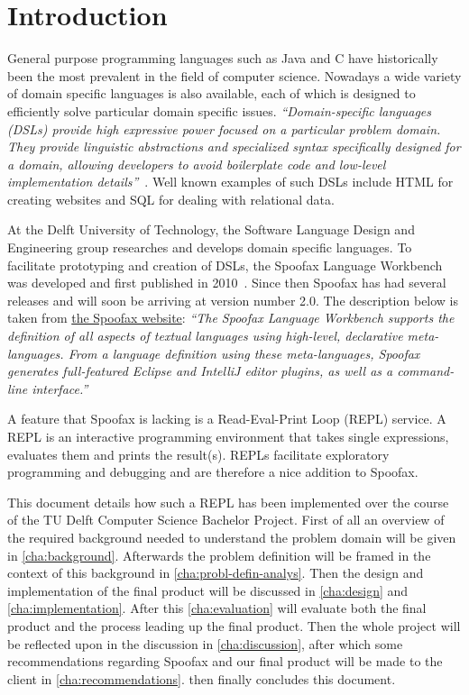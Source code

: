 \chapter{Introduction}
\label{cha:introduction}

General purpose programming languages such as Java and C have historically been
the most prevalent in the field of computer science. Nowadays a wide variety of
domain specific languages is also available, each of which is designed to
efficiently solve particular domain specific issues. \textit{``Domain-specific
languages (DSLs) provide high expressive power focused on a particular problem
domain. They provide linguistic abstractions and specialized syntax
specifically designed for a domain, allowing developers to avoid boilerplate
code and low-level implementation details''}~\cite{Kats10a}. Well known
examples of such DSLs include HTML for creating websites and SQL for dealing
with relational data.

At the Delft University of Technology, the Software Language Design and
Engineering group researches and develops domain specific languages. To
facilitate prototyping and creation of DSLs, the Spoofax Language Workbench was
developed and first published in 2010~\cite{Kats10a}. Since then Spoofax has had
several releases and will soon be arriving at version number 2.0. The
description below is taken from \href{http://spoofax.org}{the Spoofax website}:
\textit{``The Spoofax Language Workbench supports the definition of all aspects
of textual languages using high-level, declarative meta-languages. From a
language definition using these meta-languages, Spoofax generates full-featured
Eclipse and IntelliJ editor plugins, as well as a command-line interface.''}

A feature that Spoofax is lacking is a Read-Eval-Print Loop (REPL) service. A
REPL is an interactive programming environment that takes single expressions,
evaluates them and prints the result(s). REPLs facilitate exploratory
programming and debugging and are therefore a nice addition to Spoofax.

This document details how such a REPL has been implemented over the course of
the TU Delft Computer Science Bachelor Project. First of all an overview of the
required background needed to understand the problem domain will be given in
\cref{cha:background}. Afterwards the problem definition will be framed in the
context of this background in \cref{cha:probl-defin-analys}. Then the design
and implementation of the final product will be discussed in \cref{cha:design}
and \cref{cha:implementation}. After this \cref{cha:evaluation} will evaluate
both the final product and the process leading up the final product. Then the
whole project will be reflected upon in the discussion in \cref{cha:discussion},
after which some recommendations regarding Spoofax and our final product will be
made to the client in \cref{cha:recommendations}.  then
finally concludes this document.

